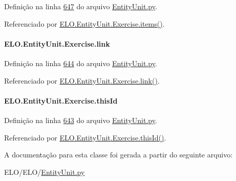 Definição na linha \hyperlink{EntityUnit_8py_source_l00647}{647} do arquivo \hyperlink{EntityUnit_8py_source}{Entity\-Unit.\-py}.



Referenciado por \hyperlink{classELO_1_1EntityUnit_1_1Exercise_a7e95e4287551ac552687fa5d0acb6305}{E\-L\-O.\-Entity\-Unit.\-Exercise.\-items()}.

\hypertarget{classELO_1_1EntityUnit_1_1Exercise_a13a9382d9126f07ab380ea11df276ed8}{
\paragraph[{link}]{\setlength{\rightskip}{0pt plus 5cm}E\-L\-O.\-Entity\-Unit.\-Exercise.\-link}}\label{classELO_1_1EntityUnit_1_1Exercise_a13a9382d9126f07ab380ea11df276ed8}


Definição na linha \hyperlink{EntityUnit_8py_source_l00644}{644} do arquivo \hyperlink{EntityUnit_8py_source}{Entity\-Unit.\-py}.



Referenciado por \hyperlink{classELO_1_1EntityUnit_1_1Exercise_a9a140c7c2c9e4b90d1f40acfed62efd0}{E\-L\-O.\-Entity\-Unit.\-Exercise.\-link()}.

\hypertarget{classELO_1_1EntityUnit_1_1Exercise_a6277daccaa7fe96d8f0a287002cea07a}{
\paragraph[{this\-Id}]{\setlength{\rightskip}{0pt plus 5cm}E\-L\-O.\-Entity\-Unit.\-Exercise.\-this\-Id}}\label{classELO_1_1EntityUnit_1_1Exercise_a6277daccaa7fe96d8f0a287002cea07a}


Definição na linha \hyperlink{EntityUnit_8py_source_l00643}{643} do arquivo \hyperlink{EntityUnit_8py_source}{Entity\-Unit.\-py}.



Referenciado por \hyperlink{classELO_1_1EntityUnit_1_1Exercise_a16ee1a43f22c4d9f99f2a98fa02c016b}{E\-L\-O.\-Entity\-Unit.\-Exercise.\-this\-Id()}.



A documentação para esta classe foi gerada a partir do seguinte arquivo\-:\begin{DoxyCompactItemize}
\item 
E\-L\-O/\-E\-L\-O/\hyperlink{EntityUnit_8py}{Entity\-Unit.\-py}\end{DoxyCompactItemize}
